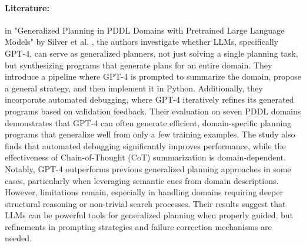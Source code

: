 \paragraph{Literature:}
in "Generalized Planning in PDDL Domains with Pretrained Large Language Models" by
Silver et al. \cite{silver2023generalizedplanningpddldomains}, the authors investigate
whether LLMs, specifically GPT-4, can serve as generalized planners, not just
solving a single planning task, but synthesizing programs that generate plans for
an entire domain. They introduce a pipeline where GPT-4 is prompted to summarize
the domain, propose a general strategy, and then implement it in Python. Additionally,
they incorporate automated debugging, where GPT-4 iteratively refines its generated
programs based on validation feedback. Their evaluation on seven PDDL domains
demonstrates that GPT-4 can often generate efficient, domain-specific planning programs
that generalize well from only a few training examples. The study also finds
that automated debugging significantly improves performance, while the effectiveness
of Chain-of-Thought (CoT) summarization is domain-dependent. Notably, GPT-4 outperforms
previous generalized planning approaches in some cases, particularly when
leveraging semantic cues from domain descriptions. However, limitations remain, especially
in handling domains requiring deeper structural reasoning or non-trivial search processes.
Their results suggest that LLMs can be powerful tools for generalized planning
when properly guided, but refinements in prompting strategies and failure correction
mechanisms are needed.